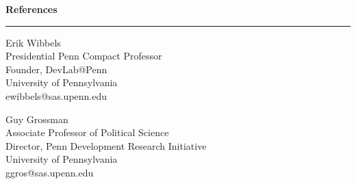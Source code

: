 \documentclass[11pt]{article}
\begin{document}
\bigskip
\textbf{\large References}\\
\rule[3mm]{\textwidth}{.2pt}
\begin{multicols}{2}
Erik Wibbels\\
Presidential Penn Compact Professor\\
Founder, DevLab@Penn\\
University of Pennsylvania\\
ewibbels@sas.upenn.edu

Guy Grossman\\
Associate Professor of Political Science\\
Director, Penn Development Research Initiative\\
University of Pennsylvania\\
ggros@sas.upenn.edu







\end{multicols}
\end{document}
